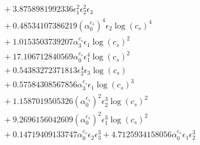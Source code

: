 \documentclass[10pt]{article}
\begin{document}
\begin{align*}
&{}  + 3.8758981992336 \epsilon_{1}^{2} \epsilon_{2}^{2} \epsilon_{3} \\
&{}  + 0.48534107386219 \left(\alpha_{0}^{c_s}\right)^{4} \epsilon_{2} \log{\left(c_{s} \right)}^{4} \\
&{}  + 1.0153503739207 \alpha_{3}^{c_s} \epsilon_{1} \log{\left(c_{s} \right)}^{2} \\
&{}  + 17.106712840569 \alpha_{0}^{c_s} \epsilon_{1}^{4} \log{\left(c_{s} \right)}^{2} \\
&{}  + 0.54383272371813 \epsilon_{2}^{4} \epsilon_{3} \log{\left(c_{s} \right)} \\
&{}  + 0.57584308567856 \alpha_{3}^{c_s} \epsilon_{1} \log{\left(c_{s} \right)}^{3} \\
&{}  + 1.1587019505326 \left(\alpha_{0}^{c_s}\right)^{2} \epsilon_{2}^{3} \log{\left(c_{s} \right)}^{2} \\
&{}  + 9.2696156042609 \left(\alpha_{0}^{c_s}\right)^{2} \epsilon_{1}^{3} \log{\left(c_{s} \right)}^{2} \\
&{}  + 0.14719409133747 \alpha_{0}^{c_s} \epsilon_{2} \epsilon_{3}^{3} + 4.7125934158056 \alpha_{0}^{c_s} \epsilon_{1} \epsilon_{2}^{3}
\end{align*}
\end{document}
